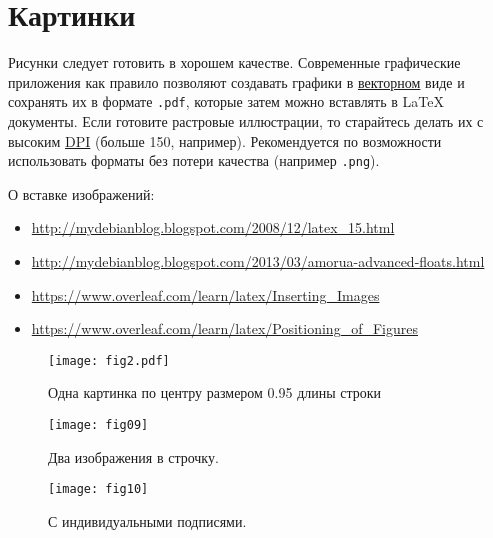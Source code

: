 \chapter{Картинки}\label{ch:fig}

Рисунки следует готовить в хорошем качестве. Современные графические приложения как правило позволяют создавать графики в \href{https://ru.wikipedia.org/wiki/%D0%92%D0%B5%D0%BA%D1%82%D0%BE%D1%80%D0%BD%D0%B0%D1%8F_%D0%B3%D1%80%D0%B0%D1%84%D0%B8%D0%BA%D0%B0}{векторном} виде и сохранять их в формате \verb|.pdf|, которые затем можно вставлять в \LaTeX\, документы. Если готовите растровые иллюстрации, то старайтесь делать их с высоким \href{https://ru.wikipedia.org/wiki/Dots_per_inch}{DPI} (больше 150, например). Рекомендуется по возможности  использовать форматы без потери качества (например \verb|.png|).

О вставке изображений:

\begin{itemize}
	\item \href{http://mydebianblog.blogspot.com/2008/12/latex_15.html}{http://mydebianblog.blogspot.com/2008/12/latex\_15.html}
	\item \href{http://mydebianblog.blogspot.com/2013/03/amorua-advanced-floats.html}{http://mydebianblog.blogspot.com/2013/03/amorua-advanced-floats.html}
	\item \href{https://www.overleaf.com/learn/latex/Inserting_Images}{https://www.overleaf.com/learn/latex/Inserting\_Images}
	\item \href{https://www.overleaf.com/learn/latex/Positioning_of_Figures}{https://www.overleaf.com/learn/latex/Positioning\_of\_Figures}
\end{itemize}







\begin{figure}[h]
	\centering
	\texttt{[image: fig2.pdf]}
	\caption{Одна картинка по центру размером 0.95 длины строки}
	\label{fig:image1}%
\end{figure}


\begin{figure}[h]
	\begin{center}
		\begin{minipage}[h]{0.45\linewidth}
			\texttt{[image: fig09]}
			\caption{Два изображения в строчку.} %
			\label{fig:image2} %
		\end{minipage}
		\hfill
		\begin{minipage}[h]{0.45\linewidth}
			\texttt{[image: fig10]}
			\caption{С индивидуальными подписями.}
			\label{fig:image3}
		\end{minipage}
	\end{center}
\end{figure}



